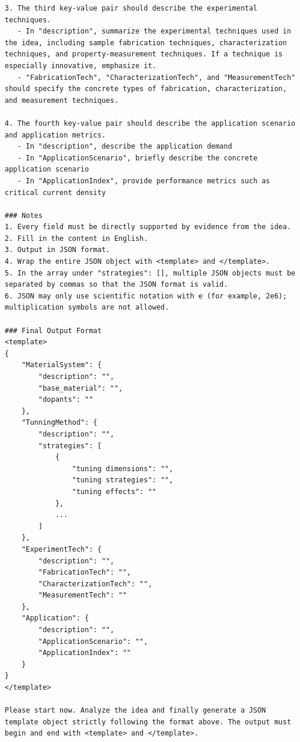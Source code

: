 \begin{lstlisting}[style=jsonstyle]
3. The third key-value pair should describe the experimental techniques.
   - In "description", summarize the experimental techniques used in the idea, including sample fabrication techniques, characterization techniques, and property-measurement techniques. If a technique is especially innovative, emphasize it.
   - "FabricationTech", "CharacterizationTech", and "MeasurementTech" should specify the concrete types of fabrication, characterization, and measurement techniques.

4. The fourth key-value pair should describe the application scenario and application metrics.
   - In "description", describe the application demand
   - In "ApplicationScenario", briefly describe the concrete application scenario
   - In "ApplicationIndex", provide performance metrics such as critical current density

### Notes
1. Every field must be directly supported by evidence from the idea.
2. Fill in the content in English.
3. Output in JSON format.
4. Wrap the entire JSON object with <template> and </template>.
5. In the array under "strategies": [], multiple JSON objects must be separated by commas so that the JSON format is valid.
6. JSON may only use scientific notation with e (for example, 2e6); multiplication symbols are not allowed.

### Final Output Format
<template>
{
    "MaterialSystem": {
        "description": "",
        "base_material": "",
        "dopants": ""
    },
    "TunningMethod": {
        "description": "",
        "strategies": [
            {
                "tuning dimensions": "",
                "tuning strategies": "",
                "tuning effects": ""
            },
            ...
        ]
    },
    "ExperimentTech": {
        "description": "",
        "FabricationTech": "",
        "CharacterizationTech": "",
        "MeasurementTech": ""
    },
    "Application": {
        "description": "",
        "ApplicationScenario": "",
        "ApplicationIndex": ""
    }
}
</template>

Please start now. Analyze the idea and finally generate a JSON template object strictly following the format above. The output must begin and end with <template> and </template>.
\end{lstlisting}

